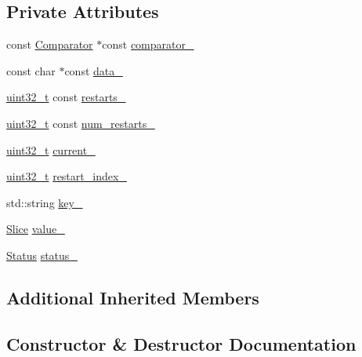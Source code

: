 \subsection*{Private Attributes}
\begin{DoxyCompactItemize}
\item 
const \hyperlink{structleveldb_1_1_comparator}{Comparator} $\ast$const \hyperlink{classleveldb_1_1_block_1_1_iter_a8d6a7b92f8871936961f03339f4f0599}{comparator\+\_\+}
\item 
const char $\ast$const \hyperlink{classleveldb_1_1_block_1_1_iter_a1c59db8f5db56e150aa59c43d8cb1976}{data\+\_\+}
\item 
\hyperlink{stdint_8h_a435d1572bf3f880d55459d9805097f62}{uint32\+\_\+t} const \hyperlink{classleveldb_1_1_block_1_1_iter_a29cd82a678d189009044c54c3e22ba24}{restarts\+\_\+}
\item 
\hyperlink{stdint_8h_a435d1572bf3f880d55459d9805097f62}{uint32\+\_\+t} const \hyperlink{classleveldb_1_1_block_1_1_iter_ac1ec61eae6825859a73d23302875fe11}{num\+\_\+restarts\+\_\+}
\item 
\hyperlink{stdint_8h_a435d1572bf3f880d55459d9805097f62}{uint32\+\_\+t} \hyperlink{classleveldb_1_1_block_1_1_iter_a138761b9a17e914cb938458231ea6420}{current\+\_\+}
\item 
\hyperlink{stdint_8h_a435d1572bf3f880d55459d9805097f62}{uint32\+\_\+t} \hyperlink{classleveldb_1_1_block_1_1_iter_aa4b7cc02f507cb8c6661a69a885e6e77}{restart\+\_\+index\+\_\+}
\item 
std\+::string \hyperlink{classleveldb_1_1_block_1_1_iter_a81757de8bc5414ccfe859e7387bee406}{key\+\_\+}
\item 
\hyperlink{classleveldb_1_1_slice}{Slice} \hyperlink{classleveldb_1_1_block_1_1_iter_a5af74baeadb7f39bb6fa5da621fe04e0}{value\+\_\+}
\item 
\hyperlink{classleveldb_1_1_status}{Status} \hyperlink{classleveldb_1_1_block_1_1_iter_a66460e3f29991e34d6435d2e13edd920}{status\+\_\+}
\end{DoxyCompactItemize}
\subsection*{Additional Inherited Members}


\subsection{Constructor \& Destructor Documentation}
\hypertarget{classleveldb_1_1_block_1_1_iter_a31b124ec1fc5750b31b182dc44282588}{}
